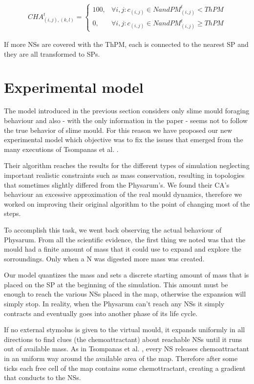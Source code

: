 \begin{align}
CHA^t_{(i, j),(k,l)}=
\begin{cases} 
100, & \forall i, j: c_{(i,j)} \in N and PM^t_{(i, j)} < ThPM\\ 
0, & \forall i, j: c_{(i,j)} \in N and  PM^t_{(i, j)} \geq ThPM 
\end{cases}
\end{align}

If more NSs are covered with the ThPM, each is connected to the nearest SP and they are all transformed to SPs. 

\section{Experimental model}

The model introduced in the previous section considers only slime mould foraging behaviour and also - with the only information in the paper - seems not to follow the true behavior of slime mould. For this reason we have proposed our new experimental model which objective was to fix the issues that emerged from the many executions of Tsompanas et al. \cite{Tsompanas2016}. 

\par
Their algorithm reaches the results for the different types of simulation neglecting important realistic constraints such as mass conservation, resulting in topologies that sometimes slightly differed from the Physarum's. We found their CA's behaviour an excessive approximation of the real mould dynamics, therefore we worked on improving their original algorithm to the point of changing most of the steps.

\par
To accomplish this task, we went back observing the actual behaviour of Physarum. From all the scientific evidence, the first thing we noted was that the mould had a finite amount of mass that it could use to expand and explore the sorroundings. Only when a N was digested more mass was created. 

\par
Our model quantizes the mass and sets a discrete starting amount of mass that is placed on the SP at the beginning of the simulation. This amount must be enough to reach the various NSs placed in the map, otherwise the expansion will simply stop. In reality, when the Physarum can't reach any NSs it simply contracts and eventually goes into another phase of its life cycle.

\par
If no external stymolus is given to the virtual mould, it expands uniformly in all directions to find clues (the chemoattractant) about reachable NSs until it runs out of available mass. As in Tsompanas et al. \cite{Tsompanas2016}, every NS releases chemoattractant in an uniform way around the available area of the map. Therefore after some ticks each free cell of the map contains some chemottractant, creating a gradient that conducts to the NSs.


